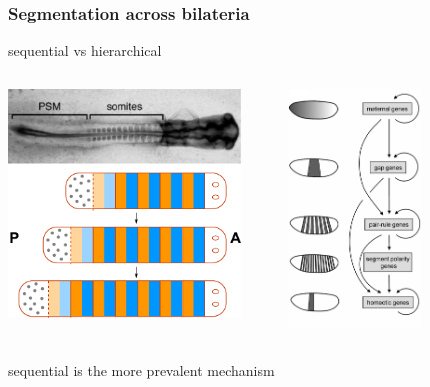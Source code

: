 \documentclass[compress]{beamer}
\begin{document}
\begin{frame}
\frametitle{Segmentation across bilateria}
   \begin{center}
   sequential vs hierarchical
   \begin{columns}
    \begin{column}{0.48\textwidth}
     \includegraphics[width=0.9\textwidth]{figures/vertebrate_segmentation.pdf}
    \end{column}
    \begin{column}{0.48\textwidth}
     \includegraphics[width=0.6\textwidth]{figures/drosophila_hierarchy.pdf}
    \end{column}
   \end{columns}
   sequential is the more prevalent mechanism
    \end{center}
\end{frame}
\end{document}
